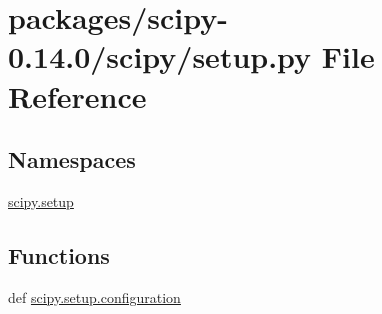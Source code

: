 \hypertarget{packages_2scipy-0_814_80_2scipy_2setup_8py}{}\section{packages/scipy-\/0.14.0/scipy/setup.py File Reference}
\label{packages_2scipy-0_814_80_2scipy_2setup_8py}
\subsection*{Namespaces}
\begin{DoxyCompactItemize}
\item 
 \hyperlink{namespacescipy_1_1setup}{scipy.\+setup}
\end{DoxyCompactItemize}
\subsection*{Functions}
\begin{DoxyCompactItemize}
\item 
def \hyperlink{namespacescipy_1_1setup_a13ab19d69cbdea93dbb36a281c958760}{scipy.\+setup.\+configuration}
\end{DoxyCompactItemize}
